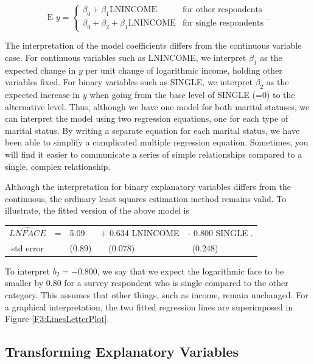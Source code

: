\begin{equation*}
\textrm{E }y = \left\{ \begin{array}{ll}
        \beta_0 + \beta_1  \textrm{LNINCOME}           & \textrm{for other respondents} \\
        \beta_0 + \beta_2 + \beta_1  \textrm{LNINCOME} & \textrm{for single respondents}
\end{array} \right. .
\end{equation*}

The interpretation of the model coefficients differs from the
continuous variable case. For continuous variables such as LNINCOME,
we interpret $\beta_1$ as the expected change in $y$ per unit change
of logarithmic income, holding other variables fixed. For binary
variables such as SINGLE, we interpret $\beta_2$ as the expected
increase in $y$ when going from the base level of SINGLE (=0) to the
alternative level. Thus, although we have one model for both marital
statuses, we can interpret the model using two regression equations,
one for each type of marital status. By writing a separate equation
for each marital status, we have been able to simplify a complicated
multiple regression equation. Sometimes, you will find it easier to
communicate a series of simple relationships compared to a single,
complex relationship.

Although the interpretation for binary explanatory variables differs
from the continuous, the ordinary least squares estimation method
remains valid. To illustrate, the fitted version of the above model
is

\begin{center}
\begin{tabular}{cclll}
  $\widehat{LNFACE}$ & = & 5.09   &  + 0.634 LNINCOME & - 0.800 SINGLE .\\
  std error    &   & (0.89) & ~~(0.078) & ~(0.248) \\
\end{tabular}
\end{center}


\noindent To interpret $b_2 = -0.800$, we say that we expect the
logarithmic face to be smaller by 0.80 for a survey respondent who
is single compared to the other category. This assumes that other
things, such as income, remain unchanged. For a graphical
interpretation, the two fitted regression lines are superimposed in
Figure \ref{F3:LinesLetterPlot}.

\linejed

\subsection{Transforming Explanatory Variables}

